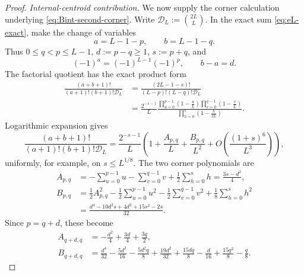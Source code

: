 \documentclass[11pt]{article}
\theoremstyle{definition}
\theoremstyle{remark}
\begin{document}
\begin{proof}
\medskip
\noindent\emph{Internal-centroid contribution.}
We now supply the corner calculation underlying
\eqref{eq:Bint-second-corner}.  Write
\(\mathscr D_L:=\binom{2L}{L}\).  In the exact sum
\eqref{eq:eL-exact}, make the change of variables
\[
 a=L-1-p,\qquad b=L-1-q.
\]
Thus \(0\le q<p\le L-1\), \(d:=p-q\ge1\), \(s:=p+q\), and
\[
 (-1)^a=(-1)^{L-1}(-1)^p,\qquad b-a=d.
\]
The factorial quotient has the exact product form
\begin{align}
 \frac{(a+b+1)!}{(a+1)!(b+1)!\mathscr D_L}
 &=\frac{(2L-1-s)!}{(L-p)!(L-q)!\mathscr D_L}\nonumber\\
 &=\frac{2^{-s-1}}{L}
 \frac{\displaystyle
   \prod_{u=0}^{p-1}\left(1-\frac{u}{L}\right)
   \prod_{v=0}^{q-1}\left(1-\frac{v}{L}\right)}
 {\displaystyle
   \prod_{h=0}^{s}\left(1-\frac{h}{2L}\right)}.
 \label{eq:eL-corner-product}
\end{align}
Logarithmic expansion gives
\begin{equation}
 \frac{(a+b+1)!}{(a+1)!(b+1)!\mathscr D_L}
 =\frac{2^{-s-1}}{L}
 \left(
 1+\frac{A_{p,q}}{L}+\frac{B_{p,q}}{L^2}
 +O\!\left(\frac{(1+s)^6}{L^3}\right)\right),
 \label{eq:eL-corner-expansion}
\end{equation}
uniformly, for example, on \(s\le L^{1/8}\).  The two corner
polynomials are
\begin{align}
 A_{p,q}
 &=-\sum_{u=0}^{p-1}u-\sum_{v=0}^{q-1}v
 +\frac12\sum_{h=0}^{s}h
 =\frac{3s-d^2}{4},
 \label{eq:eL-first-corner-polynomial}\\
 B_{p,q}
 &=\frac12A_{p,q}^2
 -\frac12\sum_{u=0}^{p-1}u^2
 -\frac12\sum_{v=0}^{q-1}v^2
 +\frac18\sum_{h=0}^{s}h^2\nonumber\\
 &=\frac{d^4-10d^2s+4d^2+15s^2-2s}{32}.
 \label{eq:eL-second-corner-polynomial}
\end{align}
Since \(p=q+d\), these become
\begin{align}
 A_{q+d,q}
 &=-\frac{d^2}{4}+\frac{3d}{4}+\frac{3q}{2},
 \label{eq:eL-A-qd}\\
 B_{q+d,q}
 &=\frac{d^4}{32}-\frac{5d^3}{16}
 -\frac{5d^2q}{8}+\frac{19d^2}{32}
 +\frac{15dq}{8}-\frac{d}{16}
 +\frac{15q^2}{8}-\frac{q}{8}.
 \label{eq:eL-B-qd}
\end{align}


\end{proof}
\end{document}
